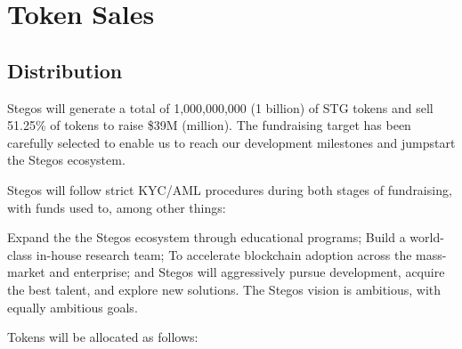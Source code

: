 \documentclass[8pt,fleqn,openany]{book}
\begin{document}
\chapter{Token Sales}\label{app:token-sales}

\section{Distribution}

Stegos will generate a total of 1,000,000,000 (1 billion) of STG tokens and sell 51.25\% of tokens to raise \$39M (million). The fundraising target has been carefully selected to enable us to reach our development milestones and jumpstart the Stegos ecosystem.

Stegos will follow strict KYC/AML procedures during both stages of fundraising, with funds used to, among other things:

Expand the the Stegos ecosystem through educational programs;
Build a world-class in-house research team;
To accelerate blockchain adoption across the mass-market and enterprise; and
Stegos will aggressively pursue development, acquire the best talent, and explore new solutions. The Stegos vision is ambitious, with equally ambitious goals.

Tokens will be allocated as follows:
\end{document}
